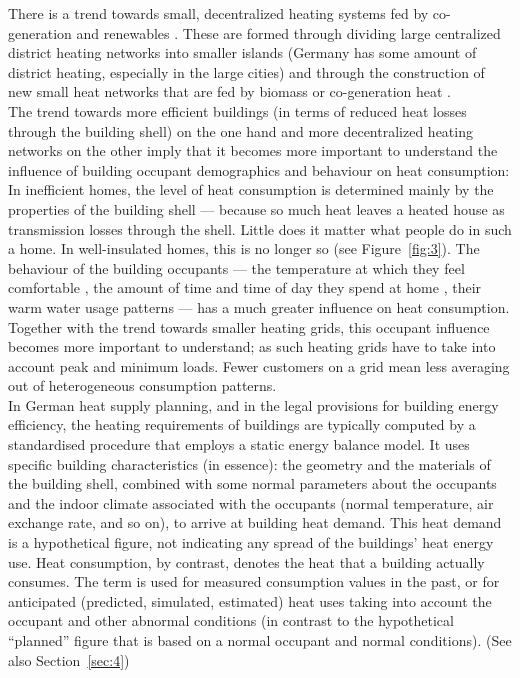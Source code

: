 \documentclass[11pt]{IJM-article}
\begin{document}
There is a trend towards small, decentralized heating systems fed by
co-generation and renewables . These are
formed through dividing large centralized district heating networks into
smaller islands (Germany has some amount of district heating, especially in the
large cities) and through the construction of new small heat networks that are
fed by biomass or co-generation heat .\\

The trend towards more efficient buildings (in terms of reduced heat losses
through the building shell) on the one hand and more decentralized heating
networks on the other imply that it becomes more important to understand the
influence of building occupant demographics and behaviour on heat
consumption: In inefficient homes, the level of heat consumption is determined
mainly by the properties of the building shell --- because so much heat leaves
a heated house as transmission losses through the shell. Little does it matter
what people do in such a home. In well-insulated homes, this is no longer so
(see Figure~\ref{fig:3}). The behaviour of the building occupants --- the
temperature at which they feel comfortable , the
amount of time and time of day they spend at home , their warm water usage patterns  --- has
a much greater influence on heat consumption.  Together with the trend towards
smaller heating grids, this occupant influence becomes more important to
understand; as such heating grids have to take into account peak and minimum
loads. Fewer customers on a grid mean less averaging out of heterogeneous
consumption patterns.\\

In German heat supply planning, and in the legal provisions for building energy
efficiency, the heating requirements of buildings are typically computed by a
standardised procedure that employs a static energy balance model. It uses
specific building characteristics (in essence): the geometry and the materials
of the building shell, combined with some normal parameters about the occupants
and the indoor climate associated with the occupants (normal temperature, air
exchange rate, and so on), to arrive at building heat demand. This heat demand
is a hypothetical figure, not indicating any spread of the buildings' heat
energy use. Heat consumption, by contrast, denotes the heat that a building
actually consumes. The term is used for measured consumption values in the
past, or for anticipated (predicted, simulated, estimated) heat uses taking
into account the occupant and other abnormal conditions (in contrast to the
hypothetical ``planned'' figure that is based on a normal occupant and normal
conditions). (See also Section~\ref{sec:4})\\
\end{document}
